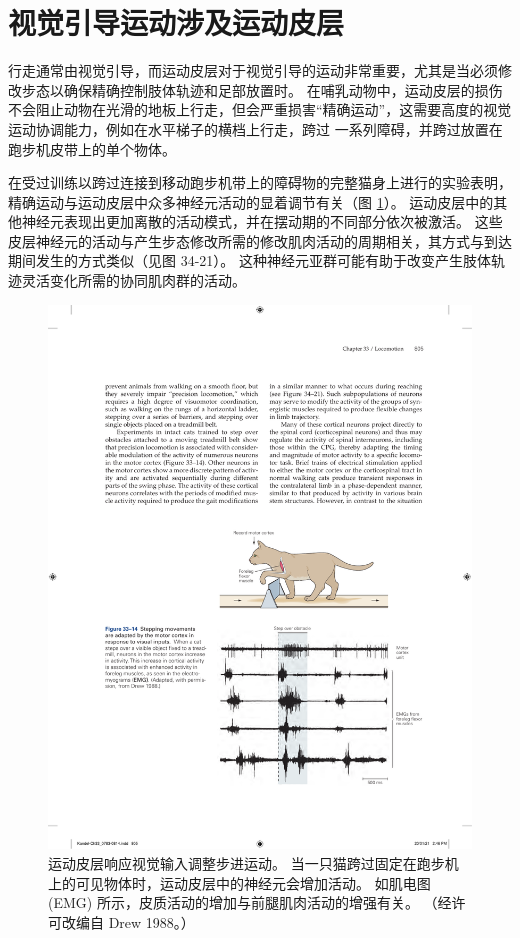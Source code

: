 \section{视觉引导运动涉及运动皮层}

行走通常由视觉引导，而运动皮层对于视觉引导的运动非常重要，尤其是当必须修改步态以确保精确控制肢体轨迹和足部放置时。
在哺乳动物中，运动皮层的损伤不会阻止动物在光滑的地板上行走，但会严重损害“精确运动”，这需要高度的视觉运动协调能力，例如在水平梯子的横档上行走，跨过 一系列障碍，并跨过放置在跑步机皮带上的单个物体。


在受过训练以跨过连接到移动跑步机带上的障碍物的完整猫身上进行的实验表明，精确运动与运动皮层中众多神经元活动的显着调节有关（图 \ref{fig:33_14}）。
运动皮层中的其他神经元表现出更加离散的活动模式，并在摆动期的不同部分依次被激活。
这些皮层神经元的活动与产生步态修改所需的修改肌肉活动的周期相关，其方式与到达期间发生的方式类似（见图 34-21）。
这种神经元亚群可能有助于改变产生肢体轨迹灵活变化所需的协同肌肉群的活动。


\begin{figure}[htbp]
	\centering
	\includegraphics[width=0.75\linewidth]{chap33/fig_33_14}
	\caption{运动皮层响应视觉输入调整步进运动。 当一只猫跨过固定在跑步机上的可见物体时，运动皮层中的神经元会增加活动。 如肌电图 (EMG) 所示，皮质活动的增加与前腿肌肉活动的增强有关。 （经许可改编自 Drew 1988。）}
	\label{fig:33_14}
\end{figure}


